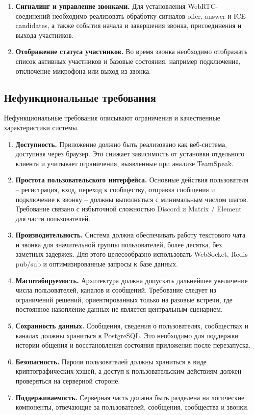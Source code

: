 \documentclass[a4paper,12pt]{extarticle}
\begin{document}
\begin{enumerate}
    \item \textbf{Сигналинг и управление звонками.} Для установления WebRTC-соединений необходимо реализовать обработку сигналов offer, answer и ICE candidates, а также события начала и завершения звонка, присоединения и выхода участников.
    \item \textbf{Отображение статуса участников.} Во время звонка необходимо отображать список активных участников и базовые состояния, например подключение, отключение микрофона или выход из звонка.
\end{enumerate}

\subsection{Нефункциональные требования}

Нефункциональные требования описывают ограничения и качественные характеристики системы.

\begin{enumerate}
    \item \textbf{Доступность.} Приложение должно быть реализовано как веб-система, доступная через браузер. Это снижает зависимость от установки отдельного клиента и учитывает ограничения, выявленные при анализе TeamSpeak.
    \item \textbf{Простота пользовательского интерфейса.} Основные действия пользователя -- регистрация, вход, переход к сообществу, отправка сообщения и подключение к звонку -- должны выполняться с минимальным числом шагов. Требование связано с избыточной сложностью Discord и Matrix / Element для части пользователей.
    \item \textbf{Производительность.} Система должна обеспечивать работу текстового чата и звонка для значительной группы пользователей, более десятка, без заметных задержек. Для этого целесообразно использовать WebSocket, Redis pub/sub и оптимизированные запросы к базе данных.
    \item \textbf{Масштабируемость.} Архитектура должна допускать дальнейшее увеличение числа пользователей, каналов и сообщений. Требование следует из ограничений решений, ориентированных только на разовые встречи, где постоянное накопление данных не является центральным сценарием.
    \item \textbf{Сохранность данных.} Сообщения, сведения о пользователях, сообществах и каналах должны храниться в PostgreSQL. Это необходимо для поддержки истории общения и восстановления состояния приложения после перезапуска.
    \item \textbf{Безопасность.} Пароли пользователей должны храниться в виде криптографических хэшей, а доступ к пользовательским действиям должен проверяться на серверной стороне.
    \item \textbf{Поддерживаемость.} Серверная часть должна быть разделена на логические компоненты, отвечающие за пользователей, сообщения, сообщества и звонки.
\end{enumerate}
\end{document}
